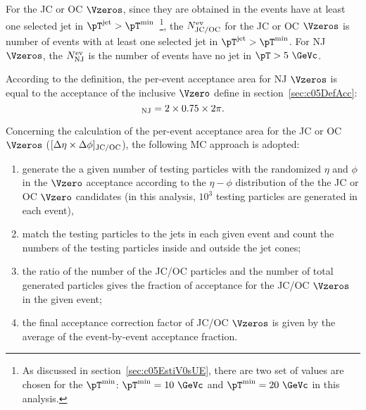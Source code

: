 For the JC or OC $\Vzeros$, since they are obtained in the events have at
least one selected jet in $\pT^{\rm jet}>\pT^{\min}$~\footnote{As discussed
in section~\ref{sec:c05EstiV0sUE},
there are two set of values are chosen
for the $\pT^{\min}$: $\pT^{\min}=10~\GeVc$ and $\pT^{\min}=20~\GeVc$ in
this analysis.},
the $N_{\rm JC/OC}^{\rm ev}$ for the JC or OC $\Vzeros$ is number of events
with at least one selected jet in  $\pT^{\rm jet}>\pT^{\min}$.
For NJ $\Vzeros$, the $N_{\rm NJ}^{\rm ev}$ is the number of events have
no jet in $\pT>5~\GeVc$.

According to the definition,
the per-event acceptance area for NJ $\Vzeros$ is equal to the
acceptance of the inclusive $\Vzero$ define in section~\ref{sec:c05DefAcc}:
\begin{equation}
[\Delta\eta\times\Delta\phi]_{\rm NJ}=2\times 0.75\times 2\pi.
\end{equation}

Concerning the calculation of the per-event acceptance area for the JC or
OC $\Vzeros$ ($[\Delta\eta\times\Delta\phi]_{\rm JC/OC}$),
the following MC approach is adopted:
\begin{enumerate}
\item generate the a given number of testing particles with the
      randomized $\eta$ and $\phi$ in the $\Vzero$ acceptance according to the
      $\eta-\phi$ distribution of the the JC or OC $\Vzero$ candidates (in this
      analysis, $10^{3}$ testing particles are generated in each event),
\item match the testing particles to the jets in each given event
      and count the numbers of the testing particles inside and outside
      the jet cones;
\item the ratio of the number of the JC/OC particles and the number of
      total generated particles gives the fraction of acceptance for
      the JC/OC $\Vzeros$ in the given event;
\item the final acceptance correction factor of JC/OC $\Vzeros$ is given
      by the average of the event-by-event acceptance fraction.
\end{enumerate}


